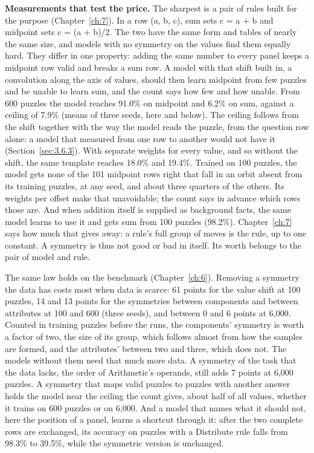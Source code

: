 \textbf{Measurements that test the price.} The sharpest is a pair of rules built for the purpose (Chapter~\ref{ch:7}). In a row (a, b, c), sum sets c = a + b and midpoint sets c = (a + b)/2. The two have the same form and tables of nearly the same size, and models with no symmetry on the values find them equally hard. They differ in one property: adding the same number to every panel keeps a midpoint row valid and breaks a sum row. A model with that shift built in, a convolution along the axis of values, should then learn midpoint from few puzzles and be unable to learn sum, and the count says how few and how unable. From 600 puzzles the model reaches 91.0\% on midpoint and 6.2\% on sum, against a ceiling of 7.9\% (means of three seeds, here and below). The ceiling follows from the shift together with the way the model reads the puzzle, from the question row alone: a model that measured from one row to another would not have it (Section~\ref{sec:3.6.3}). With separate weights for every value, and so without the shift, the same template reaches 18.0\% and 19.4\%. Trained on 100 puzzles, the model gets none of the 101 midpoint rows right that fall in an orbit absent from its training puzzles, at any seed, and about three quarters of the others. Its weights per offset make that unavoidable; the count says in advance which rows those are. And when addition itself is supplied as background facts, the same model learns to use it and gets sum from 100 puzzles (98.2\%). Chapter~\ref{ch:7} says how much that gives away: a rule's full group of moves is the rule, up to one constant. A symmetry is thus not good or bad in itself. Its worth belongs to the pair of model and rule.

The same law holds on the benchmark (Chapter~\ref{ch:6}). Removing a symmetry the data has costs most when data is scarce: 61 points for the value shift at 100 puzzles, 14 and 13 points for the symmetries between components and between attributes at 100 and 600 (three seeds), and between 0 and 6 points at 6,000. Counted in training puzzles before the runs, the components' symmetry is worth a factor of two, the size of its group, which follows almost from how the samples are formed, and the attributes' between two and three, which does not. The models without them need that much more data. A symmetry of the task that the data lacks, the order of Arithmetic's operands, still adds 7 points at 6,000 puzzles. A symmetry that maps valid puzzles to puzzles with another answer holds the model near the ceiling the count gives, about half of all values, whether it trains on 600 puzzles or on 6,000. And a model that names what it should not, here the position of a panel, learns a shortcut through it: after the two complete rows are exchanged, its accuracy on puzzles with a Distribute rule falls from 98.3\% to 39.5\%, while the symmetric version is unchanged.


